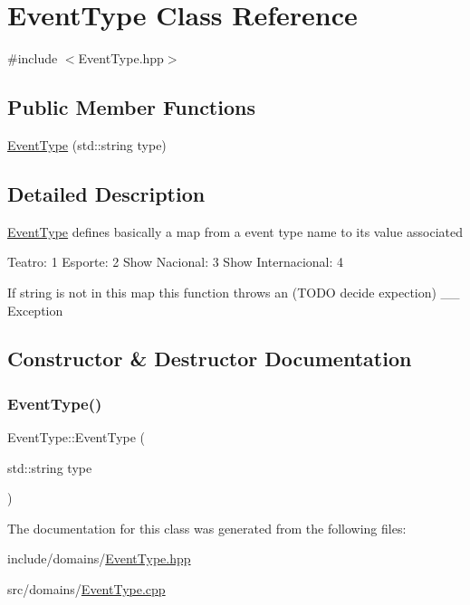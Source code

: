 \hypertarget{class_event_type}{}\section{Event\+Type Class Reference}
\label{class_event_type}


{\ttfamily \#include $<$Event\+Type.\+hpp$>$}

\subsection*{Public Member Functions}
\begin{DoxyCompactItemize}
\item 
\mbox{\hyperlink{class_event_type_a36dbb5abf9ee8443485918bdf529d257}{Event\+Type}} (std\+::string type)
\end{DoxyCompactItemize}


\subsection{Detailed Description}
\mbox{\hyperlink{class_event_type}{Event\+Type}} defines basically a map from a event type name to its value associated

Teatro\+: 1 Esporte\+: 2 Show Nacional\+: 3 Show Internacional\+: 4

If string is not in this map this function throws an (T\+O\+DO decide expection) \+\_\+\+\_\+ Exception 

\subsection{Constructor \& Destructor Documentation}
\mbox{\label{class_event_type_a36dbb5abf9ee8443485918bdf529d257}} 
\subsubsection{\texorpdfstring{EventType()}{EventType()}}
{\footnotesize\ttfamily Event\+Type\+::\+Event\+Type (\begin{DoxyParamCaption}\item[{std\+::string}]{type }\end{DoxyParamCaption})}



The documentation for this class was generated from the following files\+:\begin{DoxyCompactItemize}
\item 
include/domains/\mbox{\hyperlink{_event_type_8hpp}{Event\+Type.\+hpp}}\item 
src/domains/\mbox{\hyperlink{_event_type_8cpp}{Event\+Type.\+cpp}}\end{DoxyCompactItemize}
